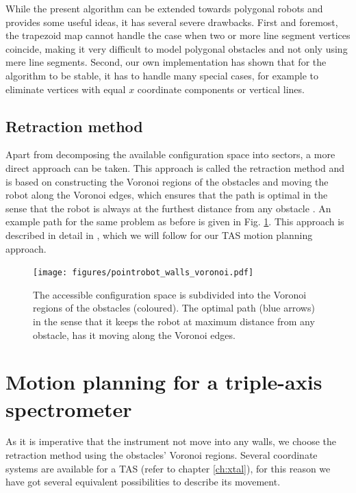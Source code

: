 While the present algorithm can be extended towards polygonal robots \cite[Ch. 13.3, pp. 290-297]{Berg2008} 
and provides some useful ideas, it has several severe drawbacks. First and 
foremost, the trapezoid map cannot handle the case when two or more line segment 
vertices coincide, making it very difficult to model polygonal obstacles and not 
only using mere line segments. Second, our own implementation has shown that for 
the algorithm to be stable, it has to handle many special cases, for example to 
eliminate vertices with equal $x$ coordinate components or vertical lines.

\vspace{0.5cm}

\subsection{Retraction method}
Apart from decomposing the available configuration space into sectors, a more 
direct approach can be taken. 
This approach is called the retraction method and is based on constructing the 
Voronoi regions of the obstacles and moving the robot along the Voronoi edges, 
which ensures that the path is optimal in the sense that the robot is always at 
the furthest distance from any obstacle \cite[pp. 163 and 304]{Berg2008}.
An example path for the same problem as before is given in Fig. \ref{fig:robot_voronoi}.
This approach is described in detail in \cite[pp. 247-251]{FUH_geo2020}, which 
we will follow for our TAS motion planning approach.

\begin{figure}[htb]
	\centering
	\texttt{[image: figures/pointrobot\_walls\_voronoi.pdf]}
	\caption[Path-finding using Voronoi diagrams.]{
		The accessible configuration space is subdivided into the Voronoi regions 
		of the obstacles (coloured). The optimal path (blue arrows) in the sense 
		that it keeps the robot at maximum distance from any obstacle, has it 
		moving along the Voronoi edges.}
	\label{fig:robot_voronoi}
\end{figure}



\section{Motion planning for a triple-axis spectrometer}
\label{sec:tasrobot}

As it is imperative that the instrument not move into any walls, we choose the 
retraction method using the obstacles' Voronoi regions.
Several coordinate systems are available for a TAS (refer to chapter \ref{ch:xtal}), 
for this reason we have got several equivalent possibilities to describe its movement. 


